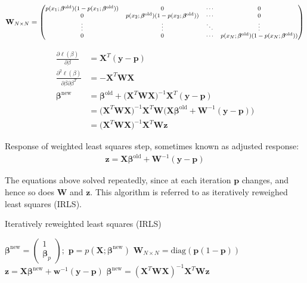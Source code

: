     \documentclass[12pt,fleqn,a4paper]{article}%
\theoremstyle{definition}
\theoremstyle{plain}
\numberwithin{equation}{section}
\begin{document}
\begin{gather*}
\footnotesize
\mathbf{W}_{N \times N} = \begin{pmatrix}
  p(x_{1};\boldsymbol{\beta}^{\text{old}})(1-p(x_{1};\boldsymbol{\beta}^{\text{old}})) & 0 & \cdots & 0 \\
  0 & p(x_{2};\boldsymbol{\beta}^{\text{old}})(1-p(x_{2};\boldsymbol{\beta}^{\text{old}})) & \cdots & 0 \\
  \vdots & \vdots & \ddots & \vdots  \\
  0 & 0 & \cdots & p(x_{N};\boldsymbol{\beta}^{\text{old}})(1-p(x_{N};\boldsymbol{\beta}^{\text{old}}))
 \end{pmatrix}
\end{gather*}

\begin{align*}
\frac{\partial \ell(\beta)}{\partial \beta} & = \mathbf{X}^{T}(\mathbf{y}-\mathbf{p}) \\
\frac{\partial^{2} \ell(\beta)}{\partial \beta \partial \beta^{T}}  & = -\mathbf{X}^{T} \mathbf{W} \mathbf{X} \\
\boldsymbol{\beta}^{\text{new}} &= \boldsymbol{\beta}^{\text{old}} + \big( \mathbf{X}^{T} \mathbf{W} \mathbf{X} \big)^{-1} \mathbf{X}^{T}(\mathbf{y}-\mathbf{p}) \\
 & = \big( \mathbf{X}^{T} \mathbf{W} \mathbf{X} \big)^{-1} \mathbf{X}^{T} \mathbf{W} \big( \mathbf{X} \boldsymbol{\beta}^{\text{old}} +  \mathbf{W}^{-1}(\mathbf{y}-\mathbf{p})\big) \\
 & = \big( \mathbf{X}^{T} \mathbf{W} \mathbf{X} \big)^{-1} \mathbf{X}^{T} \mathbf{W} \mathbf{z}
\end{align*}

Response of weighted least squares step, sometimes known as adjusted response:
\begin{gather}
\mathbf{z} = \mathbf{X} \boldsymbol{\beta}^{\text{old}} +  \mathbf{W}^{-1}(\mathbf{y}-\mathbf{p})
\end{gather}

The equations above solved repeatedly, since at each iteration $\mathbf{p}$ changes, and hence so does $\mathbf{W}$ and $\mathbf{z}$.
This algorithm is referred to as iteratively reweighed least squares (IRLS).

\begin{algorithm}[H]
\caption{Iteratively reweighted least squares (IRLS)}\label{euclid}
\begin{algorithmic}[1]
\State $\boldsymbol{\beta}^{\text{new}} =  \begin{pmatrix}  1 \\ \boldsymbol{\mathbf{\beta}}_{p}  \end{pmatrix} ;$
\Repeat
\State $\mathbf{p} = p(\mathbf{X};\boldsymbol{\beta}^{\text{new}})$
\State $\mathbf{W}_{N \times N} = \text{diag}(\mathbf{p} (1-\mathbf{p}))$
\State $\mathbf{z} = \mathbf{X}\boldsymbol{\beta}^{\text{new}}+ \mathbf{w}^{-1}(\mathbf{y}-\mathbf{p})$
\State $\boldsymbol{\beta}^{\text{new}} = (\mathbf{X}^{T} \mathbf{W} \mathbf{X})^{-1} \mathbf{X}^{T} \mathbf{W} \mathbf{z} $
\end{algorithmic}
\end{algorithm}
\end{document}
